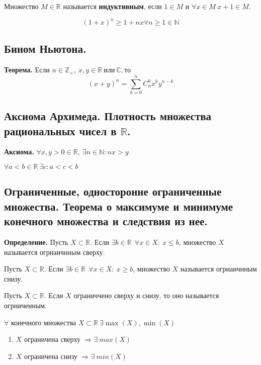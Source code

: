 \documentclass{article}
\begin{document}
 Множество $M \in \mathbb{R} $ называется {\bf индуктивным}, если $1 \in M$ и $\forall x \in M \ x + 1 \in M$.


\begin{equation*}
	(1 + x)^n \geq 1 + nx \forall n \geq 1 \in \mathbb{N}
\end{equation*} 

\subsection{Бином Ньютона.}
{\bf Теорема.} Если $n \in \mathbb{Z}_+,\ x,y \in \mathbb{R} \ \text{или} \ \mathbb{C}, \text{то}$ 
\begin{equation*}
	(x + y)^n = \displaystyle\sum\limits_{k = 0}^{n}C_n^kx^ky^{n-k}
\end{equation*}

\subsection{Аксиома Архимеда. Плотность множества рациональных чисел в $\mathbb{R}$.}
{\bf Аксиома.} $\forall x,y > 0 \in \mathbb{R},\ \exists n \in \mathbb{N} : nx > y$

 $\forall a<b \in \mathbb{R} \ \exists c: a<c<b$

\subsection{Ограниченные, односторонне ограниченные множества. Теорема о максимуме и минимуме конечного множества и следствия из нее.}
{\bf Определение.} Пусть $X \subset \mathbb{R}$. Если $\exists b \in \mathbb{R}\ \ \forall x \in X:\ x \leq b$, множество $X$ называется огрнаичнным сверху. 

 Пусть $X \subset \mathbb{R}$. Если $\exists b \in \mathbb{R}\ \ \forall x \in X:\ x \geq b$, множество $X$ называется огрнаичнным снизу. 

 Пусть $X \subset \mathbb{R}$. Если $X$ ограниччено сверху и снизу, то оно называется огрниченным.

 $\forall$ конечного множества $X \subset \mathbb{R}\ \exists \max(X), \min(X)$

\begin{enumerate}
	\item $X$ ограничена сверху $\Rightarrow \exists\ max(X)$
	\item $X$ ограничена снизу $\Rightarrow \exists\ min(X)$
\end{enumerate}
\end{document}
